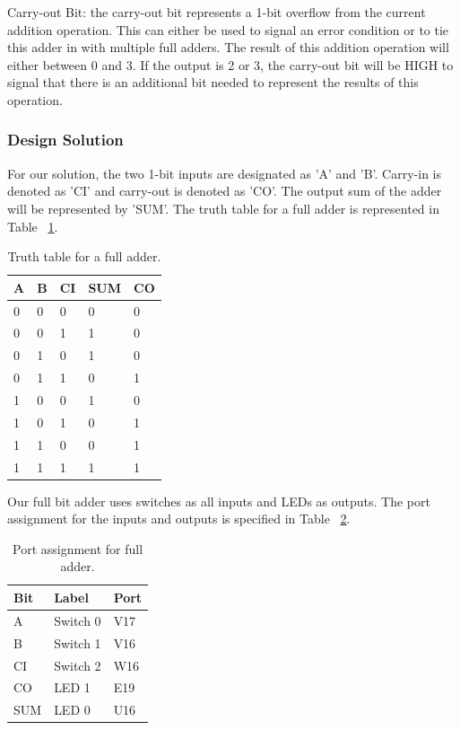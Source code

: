 \documentclass[11pt]{article}
\begin{document}
\begin{definition}
	Carry-out Bit: the carry-out bit represents a 1-bit overflow from the current addition operation. This can either be used to signal an error condition or to tie this adder in with multiple full adders. The result of this addition operation will either between 0 and 3. If the output is 2 or 3, the carry-out bit will be HIGH to signal that there is an additional bit needed to represent the results of this operation.
\end{definition}

\subsubsection{Design Solution}

For our solution, the two 1-bit inputs are designated as 'A' and 'B'. Carry-in is denoted as 'CI' and carry-out is denoted as 'CO'. The output sum of the adder will be represented by 'SUM'. The truth table for a full adder is represented in Table ~\ref{tab:fullAddTruthTable}.

\begin{table}[h]
\begin{center}
	\begin{tabular}{| l | l | l | l | l |}
		\hline
		A & B & CI & SUM & CO \\ \hline
		0 & 0 & 0 & 0 & 0 \\ \hline
		0 & 0 & 1 & 1 & 0 \\ \hline
		0 & 1 & 0 & 1 & 0 \\ \hline
		0 & 1 & 1 & 0 & 1 \\ \hline
		1 & 0 & 0 & 1 & 0 \\ \hline
		1 & 0 & 1 & 0 & 1 \\ \hline
		1 & 1 & 0 & 0 & 1 \\ \hline
		1 & 1 & 1 & 1 & 1 \\ \hline
	\end{tabular}
	\caption{\label{tab:fullAddTruthTable}Truth table for a full adder.}
	\label{tab:fullAddTruthTable}
\end{center}
\end{table}

Our full bit adder uses switches as all inputs and LEDs as outputs. The port assignment for the inputs and outputs is specified in Table ~\ref{tab:fullAddPorts}.

\begin{table}[h]
\begin{center}
	\begin{tabular}{| l | l | l |}
		\hline
		Bit & Label & Port \\ \hline
		A & Switch 0 & V17 \\ \hline
		B & Switch 1 & V16 \\ \hline
		CI & Switch 2 & W16 \\ \hline
		CO & LED 1 & E19 \\ \hline
		SUM & LED 0 & U16 \\ \hline
	\end{tabular}
	\caption{\label{tab:fullAddPorts}Port assignment for full adder.}
	\label{tab:fullAddPorts}
\end{center}	
\end{table}
\end{document}
